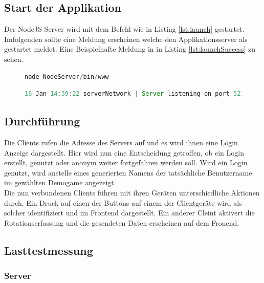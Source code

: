 \documentclass[a4paper]{spie}  %
\begin{document}
\subsection{Start der Applikation}
Der NodeJS Server wird mit dem Befehl wie in Listing \ref{lst:launch} gestartet. Imfolgenden sollte eine Meldung erscheinen welche den Applikationsserver als gestartet meldet. Eine Beispielhafte Meldung in in Listing \ref{lst:launchSuccess} zu sehen.

\begin{figure}[h!]
	\centering
        \begin{lstlisting}[language=JavaScript,caption={Start der Applikation},label={lst:launch}]
           node NodeServer/bin/www
        \end{lstlisting}
\end{figure}
\begin{figure}[h!]
	\centering
        \begin{lstlisting}[language=JavaScript,caption={Start der Applikation},label={lst:launchSuccess}]
           16 Jan 14:39:22 serverNetwork | Server listening on port 5222
        \end{lstlisting}
\end{figure}
\subsection{Durchführung}
Die Clients rufen die Adresse des Servers auf und es wird ihnen eine Login Anzeige dargestellt. Hier wird nun eine Entscheidung getroffen, ob ein Login erstellt, genutzt oder anonym weiter fortgefahren werden soll.
Wird ein Login genutzt, wird anstelle eines generierten Namens der tatsächliche Benutzername im gewählten Demogame angezeigt. \\
Die nun verbundenen Clients führen mit ihren Geräten unterschiedliche Aktionen durch. Ein Druck auf einen der Buttons auf einem der Clientgeräte wird als solcher identifiziert und im Frontend dargestellt. Ein anderer Cleint aktivert die Rotationserfassung und die gesendeten Daten erscheinen auf dem Fronend.





\subsection{Lasttestmessung}\label{Lasttestmessung} %

\subsubsection{Server}
\end{document}
